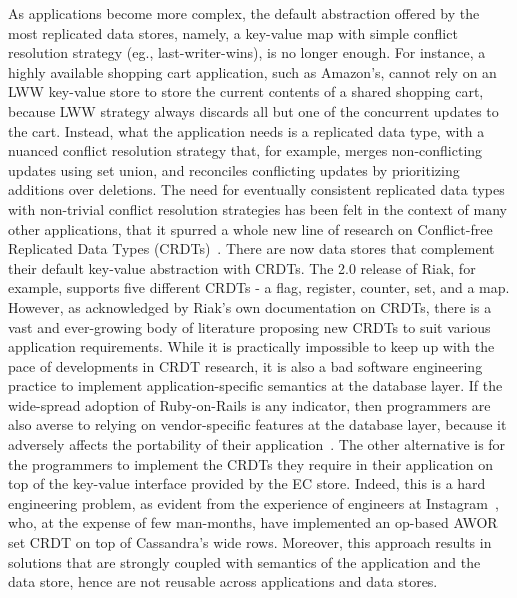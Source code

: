 As applications become more complex, the default abstraction offered
by the most replicated data stores, namely, a key-value map with
simple conflict resolution strategy (eg., last-writer-wins), is no
longer enough. For instance, a highly available shopping cart
application, such as Amazon's, cannot rely on an LWW key-value store
to store the current contents of a shared shopping cart, because LWW
strategy always discards all but one of the concurrent updates to the
cart. Instead, what the application needs is a replicated  data
type, with a nuanced conflict resolution strategy that, for example,
merges non-conflicting updates using set union, and reconciles
conflicting updates by prioritizing additions over deletions. The need
for eventually consistent replicated data types with non-trivial
conflict resolution strategies has been felt in the context of many
other applications, that it spurred a whole new line of research on
Conflict-free Replicated Data Types (CRDTs)~\cite{crdts}. There are
now data stores that complement their default key-value abstraction
with CRDTs. The 2.0 release of Riak, for example, supports five
different CRDTs - a flag, register, counter, set, and a map.  However,
as acknowledged by Riak's own documentation on CRDTs, there is a vast
and ever-growing body of literature proposing new CRDTs to suit
various application requirements. While it is practically impossible
to keep up with the pace of developments in CRDT research, it is also
a bad software engineering practice to implement application-specific
semantics at the database layer. If the wide-spread adoption of
Ruby-on-Rails is any indicator, then programmers are also averse to
relying on vendor-specific features at the database layer, because it
adversely affects the portability of their
application~\cite{BailisSIGMOD15}. The other alternative  is for the
programmers to implement  the CRDTs they require in their application
on top of the key-value interface provided by the EC store. Indeed,
this is a hard engineering problem, as evident from the experience of
engineers at Instagram~\cite{BransonC2013}, who, at the expense of few
man-months, have implemented an op-based AWOR set CRDT on top of
Cassandra's wide rows. Moreover, this approach results in solutions
that are strongly coupled with semantics of the application and the
data store, hence are not reusable across applications and data
stores.

